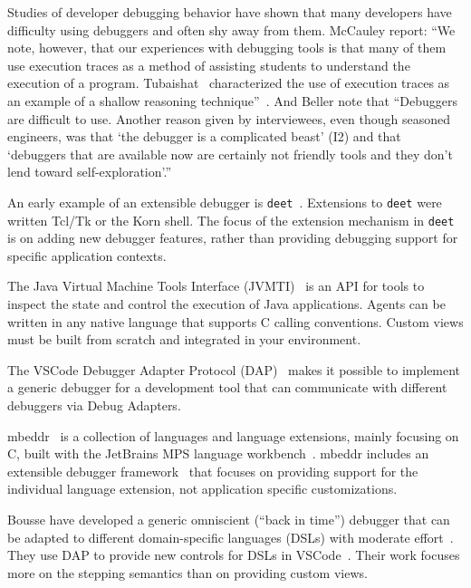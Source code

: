 \documentclass[sigplan,anonymous,review,10pt]{acmart}
\newcommand\deet{{\tt deet}\xspace}
\begin{document}
Studies of developer debugging behavior have shown that many developers have difficulty using debuggers and often shy away from them.
McCauley \etal report:
``We note, however, that our experiences with debugging tools is that many of them use execution traces as a method of assisting students to understand the execution of a program.
Tubaishat~\cite{Tuba01a} characterized the use of execution traces as an example of a shallow reasoning technique''~\cite{McCa08a}.
And Beller \etal note that
``Debuggers are difficult to use.
Another reason given by interviewees, even though seasoned engineers, was that `the debugger is a complicated beast' (I2) and that `debuggers that are available now are certainly not friendly tools and they don't lend toward self-exploration'.''
\cite{Bell18a}

An early example of an extensible debugger is \deet~\cite{Hans97a}.
Extensions to \deet were written Tcl/Tk or the Korn shell.
The focus of the extension mechanism in \deet is on adding new debugger features, rather than providing debugging support for specific application contexts.

The Java Virtual Machine Tools Interface (JVMTI)~\cite{JVMTI24} is an API for tools to inspect the state and control the execution of Java applications.
Agents can be written in any native language that supports C calling conventions.
Custom views must be built from scratch and integrated in your environment.

The VSCode Debugger Adapter Protocol (DAP)~\cite{DAP21} makes it possible to implement a generic debugger for a development tool that can communicate with different debuggers via Debug Adapters.

mbeddr~\cite{Voel17a} is a collection of languages and language extensions, mainly focusing on C, built with the JetBrains MPS language workbench~\cite{Camp14a}.
mbeddr includes an extensible debugger framework~\cite{Pavl15a} that focuses on providing support for the individual language extension, not application specific customizations.

Bousse \etal have developed a generic omniscient (``back in time'') debugger that can be adapted to different domain-specific languages (DSLs) with moderate effort~\cite{Bous18a}.
They use DAP to provide new controls for DSLs in VSCode~\cite{Enet23a}.
Their work focuses more on the stepping semantics than on providing custom views.
\end{document}
